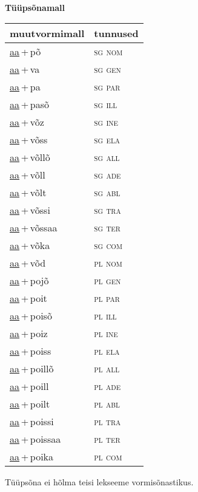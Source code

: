 \\
\vspace{1.8em}
\begin{minipage}{\textwidth}
\textbf{Tüüpsõnamall \,}\\

\begin{sideways}
\begin{tabular}{l l}
muutvormimall & tunnused \\
\hline
\underline{aa}\,+\,põ & \textsc{ sg nom } \\
\underline{aa}\,+\,va & \textsc{ sg gen } \\
\underline{aa}\,+\,pa & \textsc{ sg par } \\
\underline{aa}\,+\,pasõ & \textsc{ sg ill } \\
\underline{aa}\,+\,võz & \textsc{ sg ine } \\
\underline{aa}\,+\,võss & \textsc{ sg ela } \\
\underline{aa}\,+\,võllõ & \textsc{ sg all } \\
\underline{aa}\,+\,võll & \textsc{ sg ade } \\
\underline{aa}\,+\,võlt & \textsc{ sg abl } \\
\underline{aa}\,+\,võssi & \textsc{ sg tra } \\
\underline{aa}\,+\,võssaa & \textsc{ sg ter } \\
\underline{aa}\,+\,võka & \textsc{ sg com } \\
\underline{aa}\,+\,võd & \textsc{ pl nom } \\
\underline{aa}\,+\,pojõ & \textsc{ pl gen } \\
\underline{aa}\,+\,poit & \textsc{ pl par } \\
\underline{aa}\,+\,poisõ & \textsc{ pl ill } \\
\underline{aa}\,+\,poiz & \textsc{ pl ine } \\
\underline{aa}\,+\,poiss & \textsc{ pl ela } \\
\underline{aa}\,+\,poillõ & \textsc{ pl all } \\
\underline{aa}\,+\,poill & \textsc{ pl ade } \\
\underline{aa}\,+\,poilt & \textsc{ pl abl } \\
\underline{aa}\,+\,poissi & \textsc{ pl tra } \\
\underline{aa}\,+\,poissaa & \textsc{ pl ter } \\
\underline{aa}\,+\,poika & \textsc{ pl com } \\
\end{tabular}
\end{sideways}
\label{tab:tüüpsõnamall-aapõ}

\end{minipage}

 
\vspace{1em}
\noindent Tüüpsõna ei hõlma teisi lekseeme vormi\-sõnastikus.
